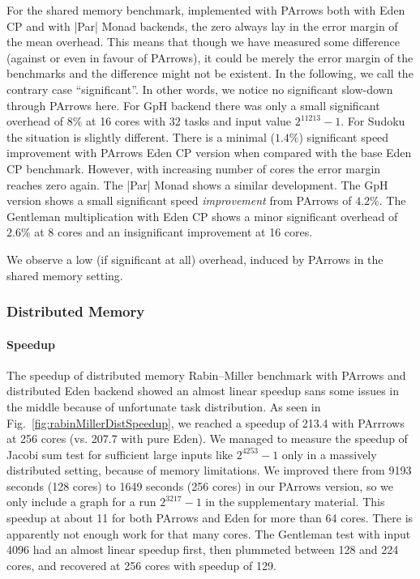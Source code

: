 For the shared memory \rmtest benchmark, implemented with PArrows both with Eden CP and with |Par| Monad backends,  the zero  always lay in the error margin of the mean overhead. This means that though we have measured some difference (against or even in favour of PArrows), it could be merely the error margin of the benchmarks and the difference might not be existent. In the following, we call the contrary case “significant”. In other words, we notice no significant slow-down through PArrows here. For GpH backend there was only a small significant overhead of $8\%$ at 16 cores with 32 tasks and input value $2^{11213}-1$.
For Sudoku the situation is slightly different. There is a minimal ($1.4\%$) significant speed improvement with PArrows Eden CP version when compared with the base Eden CP benchmark. However, with increasing number of cores the error margin reaches zero again. The |Par| Monad shows a similar development. The GpH version shows a small significant speed \textit{improvement} from PArrows of $4.2\%$.
The Gentleman multiplication with Eden CP shows a minor significant overhead of $2.6\%$ at 8 cores and an insignificant improvement at 16 cores.

We observe a low (if significant at all) overhead, induced by PArrows in the shared memory setting.

\subsubsection{Distributed Memory}

\paragraph{Speedup}
The speedup of distributed memory Rabin–Miller benchmark with PArrows and distributed Eden backend showed an almost linear speedup sans some issues in the middle because of unfortunate task distribution. As seen in Fig.~\ref{fig:rabinMillerDistSpeedup}, we reached a speedup of 213.4 with PArrrows at 256 cores (vs. 207.7 with pure Eden). We managed to measure the speedup of Jacobi sum test for sufficient large inputs like $2^{4253}-1$ only in a massively distributed setting, because of memory limitations. We improved there from 9193 seconds (128 cores) to 1649 seconds (256 cores) in our PArrows version, so we only include a graph for a run $2^{3217}-1$ in the supplementary material. This speedup at about 11 for both PArrows and Eden for more than 64 cores. There is apparently not enough work for that many cores. The Gentleman test with input 4096 had an almost linear speedup first, then plummeted between 128 and 224 cores, and recovered at 256 cores with speedup of 129.

